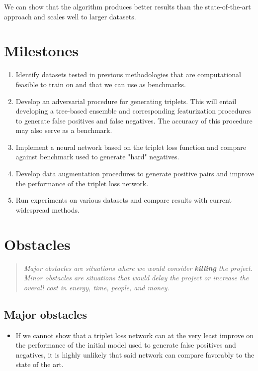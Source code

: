 \documentclass{proc}
\begin{document}
We can show that the algorithm produces better results than the state-of-the-art approach and scales well to larger datasets.

\section{Milestones}

\begin{enumerate}
  \item Identify datasets tested in previous methodologies that are computational feasible to train on and that we can use as benchmarks.
  \item Develop an adversarial procedure for generating triplets. This will entail developing a tree-based ensemble and corresponding featurization procedures to generate false positives and false negatives. The accuracy of this procedure may also serve as a benchmark.
  \item Implement a neural network based on the triplet loss function and compare against benchmark used to generate "hard" negatives.
  \item Develop data augmentation procedures to generate positive pairs and  improve the performance of the triplet loss network.
  \item Run experiments on various datasets and compare results with current widespread methods.
\end{enumerate}

\section{Obstacles}
\begin{quote}
\emph{Major obstacles are situations where we would consider \textbf{killing} the project. 
Minor obstacles are situations that would delay the project or increase the overall cost in energy, time, people, and money.}
\end{quote}

\subsection{Major obstacles} 

\begin{itemize}
  \item If we cannot show that a triplet loss network can at the very least improve on the performance of the initial model used to generate false positives and negatives, it is highly unlikely that said network can compare favorably to the state of the art.
\end{itemize}
\end{document}
